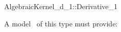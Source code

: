 \begin{ccRefConcept}{AlgebraicKernel_d_1::Derivative_1}

\ccDefinition


A model \ccVar\ of this type must provide:

{}

\end{ccRefConcept}

